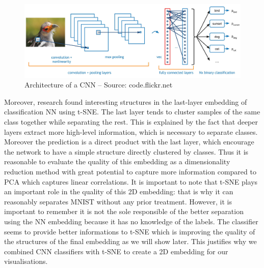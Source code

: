 \documentclass[a4paper,12pt]{report}
\begin{document}
\begin{figure}[t]
    \begin{center}
        \includegraphics[width=\textwidth]{thesis_figures/conv-net2.jpg}
    \end{center}
    \caption{Architecture of a CNN -- Source: code.flickr.net}
    \label{fig:convnet}
\end{figure}

Moreover, research found interesting structures in the last-layer embedding of classification NN using t-SNE.
The last layer tends to cluster samples of the same class together while separating the rest\cite{donahue2013decaf}\cite{yu2014visualizing}.
This is explained by the fact that deeper layers extract more high-level information, which is necessary to separate classes. Moreover the prediction is a direct product with the last layer, which encourage the network to have a simple structure directly clustered by classes.
Thus it is reasonable to evaluate the quality of this embedding as a dimensionality reduction method with great potential to capture more information compared to PCA which captures linear correlations.
It is important to note that t-SNE plays an important role in the quality of this 2D embedding: that is why it can reasonably separates MNIST without any prior treatment.
However, it is important to remember it is not the sole responsible of the better separation using the NN embedding because it has no knowledge of the labels.
The classifier seems to provide better informations to t-SNE which is improving the quality of the structures of the final embedding as we will show later.
This justifies why we combined CNN classifiers with t-SNE to create a 2D embedding for our visualisations.


\end{document}
